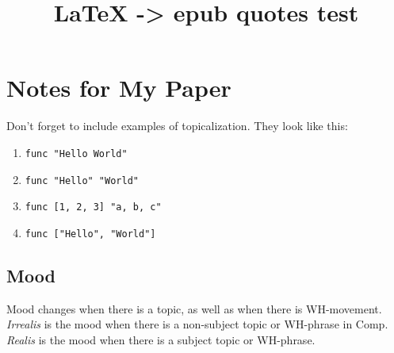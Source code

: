 \documentclass[12pt]{article}
\title{\LaTeX{} -> epub quotes test}
\begin{document}
\section*{Notes for My Paper}

Don't forget to include examples of topicalization.
They look like this:

\begin{enumerate}
\item \texttt{func "Hello World"}
\item \texttt{func "Hello" "World"}
\item \texttt{func [1, 2, 3] "a, b, c"}
\item \texttt{func ["Hello", "World"]}
\end{enumerate}

\subsection*{Mood}

Mood changes when there is a topic, as well as when
there is WH-movement.  \emph{Irrealis} is the mood when
there is a non-subject topic or WH-phrase in Comp.
\emph{Realis} is the mood when there is a subject topic
or WH-phrase.
\end{document}
